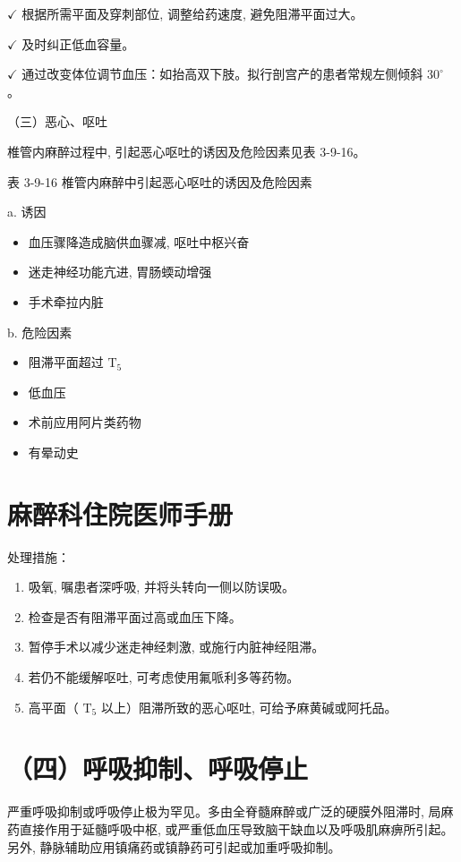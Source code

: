 \documentclass[10pt]{article}
\begin{document}
$\checkmark$ 根据所需平面及穿刺部位, 调整给药速度, 避免阻滞平面过大。

$\checkmark$ 及时纠正低血容量。

$\checkmark$ 通过改变体位调节血压：如抬高双下肢。拟行剖宫产的患者常规左侧倾斜 $30^{\circ}$ 。

（三）恶心、呕吐

椎管内麻醉过程中, 引起恶心呕吐的诱因及危险因素见表 3-9-16。

表 3-9-16 椎管内麻醉中引起恶心呕吐的诱因及危险因素

a. 诱因

\begin{itemize}
  \item 血压骤降造成脑供血骤减, 呕吐中枢兴奋
  \item 迷走神经功能亢进, 胃肠蝡动增强
  \item 手术牵拉内脏
\end{itemize}

b. 危险因素

\begin{itemize}
  \item 阻滞平面超过 $\mathrm{T}_{5}$
  \item 低血压
  \item 术前应用阿片类药物
  \item 有晕动史
\end{itemize}

\section*{麻醉科住院医师手册}
处理措施：

\begin{enumerate}
  \item 吸氧, 嘱患者深呼吸, 并将头转向一侧以防误吸。

  \item 检查是否有阻滞平面过高或血压下降。

  \item 暂停手术以减少迷走神经刺激, 或施行内脏神经阻滞。

  \item 若仍不能缓解呕吐, 可考虑使用氟哌利多等药物。

  \item 高平面（ $\mathrm{T}_{5}$ 以上）阻滞所致的恶心呕吐, 可给予麻黄碱或阿托品。

\end{enumerate}

\section*{（四）呼吸抑制、呼吸停止}
严重呼吸抑制或呼吸停止极为罕见。多由全脊髓麻醉或广泛的硬膜外阻滞时, 局麻药直接作用于延髓呼吸中枢, 或严重低血压导致脑干缺血以及呼吸肌麻痹所引起。另外, 静脉辅助应用镇痛药或镇静药可引起或加重呼吸抑制。
\end{document}
